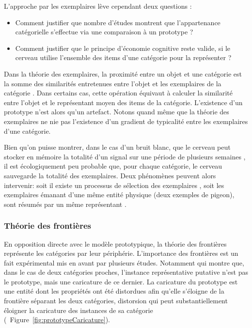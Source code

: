 L'approche par les exemplaires lève cependant deux questions \citep{goldstone2003concepts}:

\begin{itemize}
\item Comment justifier que nombre d'études montrent que l'appartenance catégorielle s'effectue via une comparaison à un prototype ?
\item Comment justifier que le principe d'économie cognitive reste valide, si le cerveau utilise l'ensemble des items d'une catégorie pour la représenter ? 
\end{itemize}

Dans la théorie des exemplaires, la proximité entre un objet et une catégorie est la somme des similarités entretenues entre l'objet et les exemplaires de la catégorie \citep{nosofsky1986attention}. Dans certains cas, cette opération équivaut à calculer la similarité entre l'objet et le représentant moyen des items de la catégorie. L’existence d'un prototype n'est alors qu'un artefact. Notons quand même que la théorie des exemplaires ne nie pas l'existence d'un gradient de typicalité entre les exemplaires d'une catégorie.

Bien qu'on puisse montrer, dans le cas d'un bruit blanc, que le cerveau peut stocker en mémoire la totalité d'un signal sur une période de plusieurs semaines  \citep{agus2010rapid}, il est écologiquement peu probable que, pour chaque catégorie, le cerveau sauvegarde la totalité des exemplaires. Deux phénomènes peuvent alors intervenir: soit il existe un processus de sélection des exemplaires \citep{palmeri1995recognition}, soit les exemplaires émanant d'une même entité physique (deux exemples de pigeon), sont résumés par un même représentant \citep{barsalou1998basing}.%

\subsubsection{Théorie des frontières}

En opposition directe avec le modèle prototypique, la théorie des frontières représente les catégories par leur périphérie. L'importance des frontières est un fait expérimental mis en avant par plusieurs études. Notamment \citep{davis2010memory} qui montre que, dans le cas de deux catégories proches, l'instance représentative putative n'est pas le prototype, mais une caricature de ce dernier. La caricature du prototype est une entité dont les propriétés ont été distordues afin qu'elle s'éloigne de la frontière séparant les deux catégories, distorsion qui peut substantiellement éloigner la caricature des instances de sa catégorie (\cf~Figure~\ref{fig:prototypeCaricature}).

